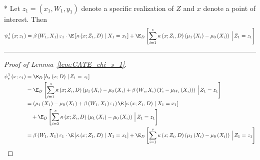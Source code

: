 \begin{lem}\label{lem:CATE_chi_s_1}\mbox{}\\*
	Let $z_1 = (x_1, W_{1}, y_1)$ denote a specific realization of $Z$ and $x$ denote a point of interest.
	Then
	\begin{equation}
		\psi_{s}^{1}\left(x; z_1\right)
		= \beta\left(W_{1}, X_1\right)\varepsilon_{1} \cdot \E\left[\kappa\left(x; Z_1, D\right) \; \middle| \; X_1 = x_1\right]
		+ \E_{D}\left[\sum_{i = 1}^{s} \kappa\left(x; Z_{i}, D\right) \left(\mu_{1}\left(X_{i}\right) - \mu_{0}\left(X_{i}\right)\right)
		\, \Big| \, Z_1 = z_1 \right]
	\end{equation}
\end{lem}
\hrule
\begin{proof}[Proof of Lemma~\ref{lem:CATE_chi_s_1}]
	\begin{equation}
		\begin{aligned}
			\psi_{s}^{1}\left(x; z_1\right)
			 & = \E_{D}\left[h_{s}\left(x; D\right) \, | \, Z_1 = z_1 \right] \\
			 & = \E_{D}\left[\sum_{i = 1}^{s} \kappa\left(x; Z_{i}, D\right) \left(\mu_{1}\left(X_{i}\right) - \mu_{0}\left(X_{i}\right) + \beta\left(W_{i}, X_{i}\right)\left(Y_{i} - \mu_{W_{i}}\left(X_{i}\right)\right)\right)
			 \, \Big| \, Z_1 = z_1 \right]\\
			 & = \left(\mu_{1}\left(X_1\right) - \mu_{0}\left(X_1\right) + \beta\left(W_{1}, X_1\right)\varepsilon_{1}\right)\E\left[\kappa\left(x; Z_1, D\right) \; \middle| \; X_1 = x_1\right]\\
			 & \quad + \E_{D}\left[\sum_{i = 2}^{s} \kappa\left(x; Z_{i}, D\right) \left(\mu_{1}\left(X_{i}\right) - \mu_{0}\left(X_{i}\right)\right)
			 \, \Big| \, Z_1 = z_1 \right]\\
			 & = \beta\left(W_{1}, X_1\right)\varepsilon_{1} \cdot \E\left[\kappa\left(x; Z_1, D\right) \; \middle| \; X_1 = x_1\right]
			 + \E_{D}\left[\sum_{i = 1}^{s} \kappa\left(x; Z_{i}, D\right) \left(\mu_{1}\left(X_{i}\right) - \mu_{0}\left(X_{i}\right)\right)
			 \, \Big| \, Z_1 = z_1 \right]
		\end{aligned}
	\end{equation}
\end{proof}


